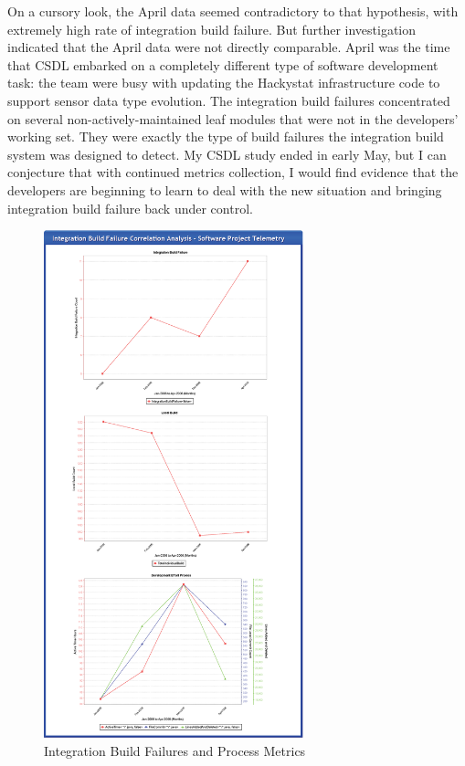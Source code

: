 On a cursory look, the April data seemed contradictory to that hypothesis, with extremely high rate of integration build failure. But further investigation indicated that the April data were not directly comparable. April was the time that CSDL embarked on a completely different type of software development task: the team were busy with updating the Hackystat infrastructure code to support sensor data type evolution. The integration build failures concentrated on several non-actively-maintained leaf modules that were not in the developers' working set. They were exactly the type of build failures the integration build system was designed to detect. My CSDL study ended in early May, but I can conjecture that with continued metrics collection, I would find evidence that the developers are beginning to learn to deal with the new situation and bringing integration build failure back under control. 

\begin{figure}[p]
  \center
  \includegraphics[width=0.67\textwidth]{figures/CSDL-CorrelationAnalysis}
  \caption{Integration Build Failures and Process Metrics} 
  \label{fig:CSDL-CorrelationAnalysis}
\end{figure}












